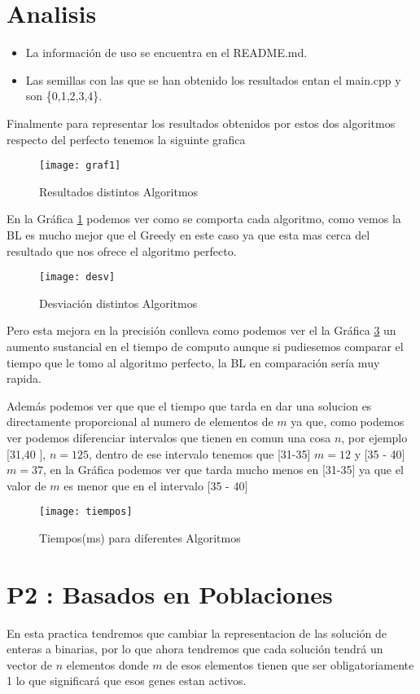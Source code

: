 \section{Analisis}
\begin{itemize}
  \item La información de uso se encuentra en el README.md.
  \item Las semillas con las que se han obtenido los resultados entan el main.cpp y son \{0,1,2,3,4\}.
\end{itemize}

Finalmente para representar los resultados obtenidos por estos dos algoritmos respecto del perfecto tenemos la siguinte grafica
\begin{figure}[h]
  \centering
  \texttt{[image: graf1]}
  \caption{Resultados distintos Algoritmos}
  \label{gra}
\end{figure}


En la Gráfica \ref{gra} podemos ver como se comporta cada algoritmo, como vemos la BL es mucho mejor que el Greedy en este caso ya que 
esta mas cerca del resultado que nos ofrece el algoritmo perfecto.\newpage


\begin{figure}[h]
  \centering
  \texttt{[image: desv]}
  \caption{Desviación distintos Algoritmos}
  \label{gra2}
\end{figure}

Pero esta mejora en la precisión conlleva como podemos ver el la Gráfica \ref{gra3} un aumento sustancial en el tiempo de computo
aunque si pudiesemos comparar el tiempo que le tomo al algoritmo perfecto, la BL en comparación sería muy rapida.

Además podemos ver que que el tiempo que tarda en dar una solucion es directamente proporcional al numero de elementos de $m$ ya
que, como podemos ver podemos diferenciar intervalos que tienen en comun una cosa $n$, por ejemplo [31,40 ], $n = 125$, dentro de ese
intervalo tenemos que [31-35] $m =12 $ y [35 - 40] $m =37 $, en la Gráfica podemos ver que tarda mucho menos en [31-35]
ya que el valor de $m$ es menor que en el intervalo [35 - 40]

\begin{figure}[h]
  \centering
  \texttt{[image: tiempos]}
  \caption{Tiempos(ms) para diferentes Algoritmos}
  \label{gra3}
\end{figure}


\section{P2 : Basados en Poblaciones}
En esta practica tendremos que cambiar la representacion de las solución de enteras a binarias, por lo
que ahora tendremos que cada solución tendrá un vector de $n$ elementos donde $m$ de esos elementos tienen que ser
obligatoriamente 1 lo que significará que esos genes estan activos.


